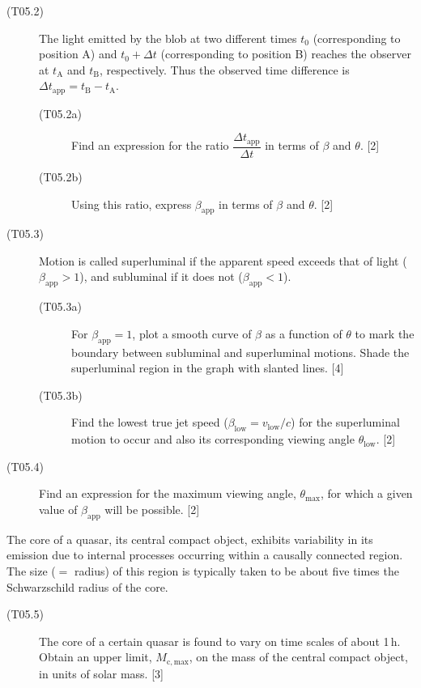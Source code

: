 \begin{description}
\item[(T05.2)] The light emitted by the blob at two different times $t_0$
  (corresponding to position A) and $t_0 + \Delta t$ (corresponding to
  position B) reaches the observer at $t_{\mathrm{A}}$ and $t_{\mathrm{B}}$,
  respectively. Thus the observed time difference is
  $\Delta t_{\mathrm{app}} = t_{\mathrm{B}} - t_{\mathrm{A}}$.
  \begin{description}
  \item[(T05.2a)] Find an expression for the ratio
    $\dfrac{\Delta t_{\mathrm{app}}}{\Delta t}$ in terms of $\beta$ and
    $\theta$. \hfill[2]
  \item[(T05.2b)] Using this ratio, express $\beta_{\mathrm{app}}$ in terms of
    $\beta$ and $\theta$. \hfill[2]
  \end{description}
\item[(T05.3)] Motion is called superluminal if the apparent speed exceeds
  that of light ($\beta_{\mathrm{app}} > 1$), and subluminal if it does not
  ($\beta_{\mathrm{app}} < 1$).
  \begin{description}
  \item[(T05.3a)] For $\beta_{\mathrm{app}} = 1$, plot a smooth curve of
    $\beta$ as a function of $\theta$ to mark the boundary between subluminal
    and superluminal motions. Shade the superluminal region in the graph with
    slanted lines. \hfill[4]
  \item[(T05.3b)] Find the lowest true jet speed
    ($\beta_{\mathrm{low}} = v_{\mathrm{low}}/c$) for the superluminal motion
    to occur and also its corresponding viewing angle $\theta_{\mathrm{low}}$.
    \hfill[2]
  \end{description}
\item[(T05.4)] Find an expression for the maximum viewing angle,
  $\theta_{\max}$, for which a given value of $\beta_{\mathrm{app}}$ will be
  possible. \hfill[2]
\end{description}

The core of a quasar, its central compact object, exhibits variability in its
emission due to internal processes occurring within a causally connected
region. The size ($=$ radius) of this region is typically taken to be about
five times the Schwarzschild radius of the core.

\begin{description}
\item[(T05.5)] The core of a certain quasar is found to vary on time scales of
  about 1\,h. Obtain an upper limit, $M_{\mathrm{c,max}}$, on the mass of the
  central compact object, in units of solar mass. \hfill[3]
\end{description}
